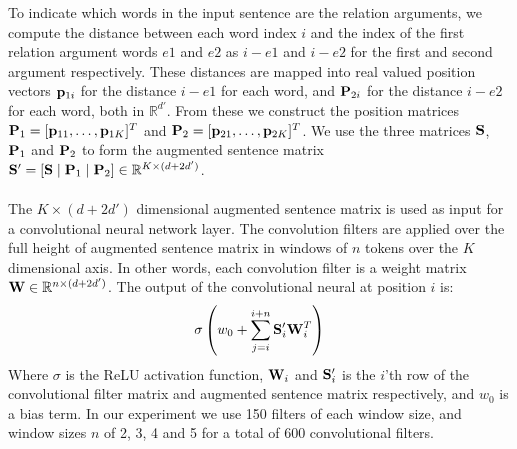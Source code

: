 To indicate which words in the input sentence are the relation arguments, we compute the distance between each word index $i$ and the index of the first relation argument words $e1$ and $e2$ as $i - e1$ and $i - e2$ for the first and second argument respectively. These distances are mapped into real valued position vectors $\mathbf{p}_{1i}$ for the distance $i - e1$ for each word, and $\mathbf{P}_{2i}$ for the distance $i - e2$ for each word, both in  $\mathbb{R}^{d'}$. From these we construct the position matrices $\mathbf{P}_1 = [\mathbf{p}_{11},\dots,\mathbf{p}_{1K}]^T$ and $\mathbf{P}_2 = [\mathbf{p}_{21},\dots,\mathbf{p}_{2K}]^T$. We use the three matrices $\mathbf{S}$, $\mathbf{P}_1$ and $\mathbf{P}_2$ to form the augmented sentence matrix $\mathbf{S}' = [\mathbf{S} \mid \mathbf{P}_1 \mid \mathbf{P}_2] \in \mathbb{R}^{K \times (d + 2d')}$.
\\\\
The $K \times (d + 2d')$ dimensional augmented sentence matrix is used as input for a convolutional neural network layer. The convolution filters are applied over the full height of augmented sentence matrix in windows of $n$ tokens over the $K$ dimensional axis. In other words, each convolution filter is a weight matrix $\mathbf{W} \in \mathbb{R}^{n \times (d + 2d')}$. The output of the convolutional neural at position $i$ is:
$$
\sigma\left(w_0 + \sum\limits_{j = i}^{i + n}\mathbf{S}'_i\mathbf{W}_i^T\right)
$$
Where $\sigma$ is the ReLU activation function, $\mathbf{W}_i$ and $\mathbf{S}'_i$ is the $i$'th row of the convolutional filter matrix and augmented sentence matrix respectively, and $w_0$ is a bias term. In our experiment we use 150 filters of each window size, and window sizes $n$ of 2, 3, 4 and 5 for a total of 600 convolutional filters.

